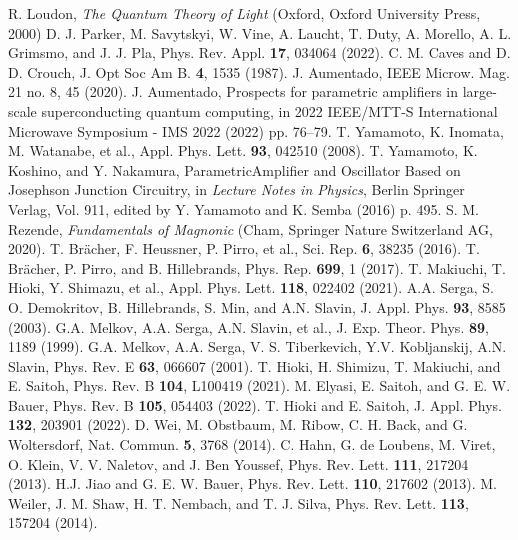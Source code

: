 \documentclass[%
 reprint,
 amsmath,amssymb,
 aps,
prb,
]{revtex4-2}
\begin{document}
\begin{thebibliography}{30}
 R. Loudon, {\textit{The Quantum Theory of Light}} (Oxford, Oxford
University Press, 2000)
  D. J. Parker, M. Savytskyi, W. Vine, A. Laucht, T. Duty, A. Morello, A. L. Grimsmo, and J. J. Pla, Phys. Rev. Appl. {\bf 17}, 034064 (2022).
C. M. Caves and D. D. Crouch, J. Opt Soc Am B. {\bf 4}, 1535 (1987).
 J. Aumentado, IEEE Microw. Mag. 21 no. 8, 45 (2020).
 J. Aumentado, Prospects for parametric amplifiers in large-scale superconducting quantum computing, in 2022 IEEE/MTT-S International Microwave Symposium - IMS 2022 (2022) pp. 76–79.
 T. Yamamoto, K. Inomata, M. Watanabe, et al., Appl. Phys. Lett. {\bf 93}, 042510 (2008).
 T. Yamamoto, K. Koshino, and Y. Nakamura, ParametricAmplifier and Oscillator Based on Josephson Junction Circuitry, in {\textit{Lecture Notes in Physics}}, Berlin Springer Verlag, Vol. 911, edited by Y. Yamamoto and K. Semba (2016) p. 495.
 S. M. Rezende, {\textit{Fundamentals of Magnonic}} (Cham, Springer Nature Switzerland AG, 2020).
 T. Brächer, F. Heussner, P. Pirro, et al., Sci. Rep. {\bf 6}, 38235 (2016).
 T. Brächer, P. Pirro, and B. Hillebrands, Phys. Rep. {\bf 699}, 1 (2017).
 T. Makiuchi, T. Hioki, Y. Shimazu, et al., Appl. Phys. Lett. {\bf 118}, 022402 (2021).
 A.A. Serga, S. O. Demokritov, B. Hillebrands, S. Min, and A.N. Slavin, J. Appl. Phys. {\bf 93}, 8585 (2003).
 G.A. Melkov, A.A. Serga, A.N. Slavin, et al., J. Exp. Theor. Phys. {\bf 89}, 1189 (1999).
 G.A. Melkov, A.A. Serga, V. S. Tiberkevich, Y.V. Kobljanskij, A.N. Slavin, Phys. Rev. E {\bf 63}, 066607 (2001).
 T. Hioki, H. Shimizu, T. Makiuchi, and E. Saitoh, Phys. Rev. B {\bf 104}, L100419 (2021).
 M. Elyasi, E. Saitoh, and G. E. W. Bauer, Phys. Rev. B {\bf 105}, 054403 (2022).
 T. Hioki and E. Saitoh, J. Appl. Phys. {\bf 132}, 203901 (2022).
 D. Wei, M. Obstbaum, M. Ribow, C. H. Back, and G. Woltersdorf, Nat. Commun. {\bf 5}, 3768 (2014).
 C. Hahn, G. de Loubens, M. Viret, O. Klein, V. V. Naletov, and J. Ben Youssef, Phys. Rev. Lett. {\bf 111}, 217204 (2013).
 H.J. Jiao and G. E. W. Bauer, Phys. Rev. Lett. {\bf 110}, 217602 (2013).
 M. Weiler, J. M. Shaw, H. T. Nembach, and T. J. Silva, Phys. Rev. Lett. {\bf 113}, 157204 (2014).

\end{thebibliography}
\end{document}
